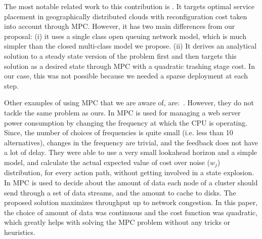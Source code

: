\documentclass[11pt]{article}
\begin{document}
		The most notable related work to this contribution is \cite{zhang2012dynamicPlacement}. It targets optimal service placement in geographically distributed clouds with reconfiguration cost taken into account through MPC. However, it has two main differences from our proposal: (i) it uses a single class open queuing network model, which is much simpler than the closed multi-class model we propose. (ii) It derives an analytical solution to a steady state version of the problem first and then targets this solution as a desired state through MPC with a quadratic trashing stage cost. In our case, this was not possible because we needed a sparse deployment at each step. 
		
		Other examples of using MPC that we are aware of, are:~\cite{baiefficient,abdelwahed2004control, kandasamy2004self, bhat2006enabling,patikirikorala2011hammerstein}. However, they do not tackle the same problem as ours.
In \cite{baiefficient,abdelwahed2004control,kandasamy2004self} MPC is used for managing a web server power consumption by changing the frequency at which the CPU is operating. Since, the number of choices of frequencies is quite small (i.e. less than 10 alternatives), changes in the frequency are trivial, and the feedback does not have a lot of delay. They were able to use a very small lookahead horizon and a simple model, and calculate the actual expected value of cost over noise ($w_j$) distribution, for every action path, without getting involved in a state explosion. 
In \cite{bhat2006enabling} MPC is used to decide about the amount of data each node of a cluster should send through a set of data streams, and the amount to cache to disks. The proposed solution maximizes throughput up to network congestion. 
 In this paper, the choice of amount of data was continuous and the cost function was quadratic, which greatly helps with solving the MPC problem without any tricks or heuristics. 

 
\end{document}
